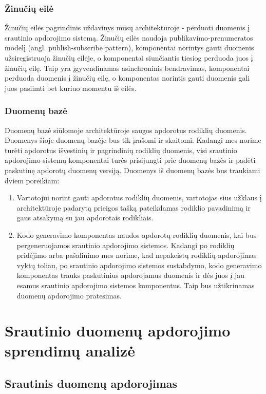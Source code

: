\documentclass{VUMIFPSbakalaurinis}
\begin{document}
\subsubsection{Žinučių eilė}

Žinučių eilės pagrindinis uždavinys mūsų architektūroje - perduoti duomenis į srautinio apdorojimo sistemą. Žinučių eilės naudoja publikavimo-prenumeratos modelį (angl. publish-subscribe pattern), komponentai norintys gauti duomenis užsiregistruoja žinučių eilėje, o komponentai siunčiantis tiesiog perduoda juos į žinučių eilę. Taip yra įgyvendinamas asinchroninis bendravimas, komponentai perduoda duomenis į žinučių eilę, o komponentas norintis gauti duomenis gali juos pasiimti bet kuriuo momentu iš eilės.

\subsubsection{Duomenų bazė}

Duomenų bazė siūlomoje architektūroje saugos apdorotus rodiklių duomenis. Duomenys šioje duomenų bazėje bus tik įrašomi ir skaitomi. Kadangi mes norime turėti apdorotus išvestinių ir pagrindinių rodiklių duomenis, visi srautinio apdorojimo sistemų komponentai turės prisijungti prie duomenų bazės ir padėti paskutinę apdorotų duomenų versiją. Duomenys iš duomenų bazės bus traukiami dviem poreikiam: 
\begin{enumerate}
    \item Vartotojui norint gauti apdorotus rodiklių duomenis, vartotojas sius užklaus į architektūroje padarytą prieigos tašką pateikdamas rodiklio pavadinimą ir gaus atsakymą su jau apdorotais rodikliais. 
    \item Kodo generavimo komponentas naudos apdorotų rodiklių duomenis, kai bus pergeneruojamos srautinio apdorojimo sistemos.  Kadangi po rodiklių pridėjimo arba pašalinimo mes norime, kad nepakeistų rodiklių apdorojimas vyktų toliau, po srautinio apdorojimo sistemos sustabdymo, kodo generavimo komponentas trauks paskutinius apdorojamus duomenis ir dės juos į jau esamus srautinio apdorojimo sistemos komponentus. Taip bus užtikrinamas duomenų apdorojimo pratesimas.   
\end{enumerate}  

\section{Srautinio duomenų apdorojimo sprendimų analizė}

\subsection{Srautinis duomenų apdorojimas} \label{strprocess}
\end{document}
